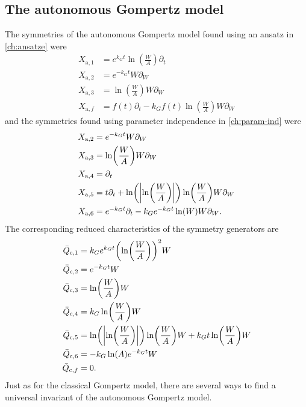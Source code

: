 \subsection{The autonomous Gompertz model}

The symmetries of the autonomous Gompertz model found using an ansatz in \cref{ch:ansatze} were
\begin{align*}
  X_{\text{a},1} &= e^{k_G t} \ln\left(\frac{W}{A}\right) \partial_t \\
  X_{\text{a},2} &= e^{-k_G t} W \partial_W \\
  X_{\text{a},3} &= \ln\left(\frac{W}{A}\right) W \partial_W \\
  X_{\text{a},f} &= f(t) \partial_t - k_G f(t) \ln\left(\frac{W}{A}\right) W \partial_W
\end{align*}
and the symmetries found using parameter independence in \cref{ch:param-ind} were
\begin{align*}
  X_{\text{a},2} &= e^{-k_G t} W \partial_W \\
  X_{\text{a},3} &= \ln\left(\frac{W}{A}\right) W \partial_W \\
  X_{\text{a},4} &= \partial_t \\
  X_{\text{a},5} &= t \partial_t + \ln\left(\abs{\ln\left(\frac{W}{A}\right)}\right) \ln\left(\frac{W}{A}\right) W \partial_W \\
  X_{\text{a},6} &= e^{-k_G t} \partial_t - k_G e^{-k_G t} \ln\mathopen{}\left(W\right)\mathclose{} W \partial_W.
\end{align*}
The corresponding reduced characteristics of the symmetry generators are
\begin{align*}
  \bar{Q}_{\text{c},1} &= k_G e^{k_G t} \left(\ln\left(\frac{W}{A}\right)\right)^2 W \\
  \bar{Q}_{\text{c},2} &= e^{-k_G t} W \\
  \bar{Q}_{\text{c},3} &= \ln\left(\frac{W}{A}\right) W\\
  \bar{Q}_{\text{c},4} &= k_G \ln\left(\frac{W}{A}\right) W \\
  \bar{Q}_{\text{c},5} &= \ln\left(\abs{\ln\left(\frac{W}{A}\right)}\right) \ln\left(\frac{W}{A}\right) W + k_G t \ln\left(\frac{W}{A}\right) W \\
  \bar{Q}_{\text{c},6} &= - k_G \ln\left(A\right) e^{-k_G t} W \\
  \bar{Q}_{\text{c},f} &= 0.
\end{align*}
Just as for the classical Gompertz model, there are several ways to find a universal invariant of the autonomous Gompertz model.
